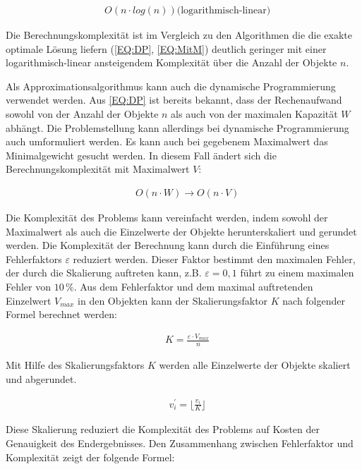 \begin{align}
    & O(n \cdot log(n)) \text{(logarithmisch-linear)}
\end{align}

Die Berechnungskomplexität ist im Vergleich zu den Algorithmen die die exakte optimale Lösung liefern (\autoref{EQ:DP}, \autoref{EQ:MitM}) deutlich geringer mit einer logarithmisch-linear ansteigendem Komplexität über die Anzahl der Objekte $ n $. 

Als Approximationsalgorithmus kann auch die dynamische Programmierung verwendet werden. Aus \autoref{EQ:DP} ist bereits bekannt, dass der Rechenaufwand sowohl von der Anzahl der Objekte $ n $ als auch von der maximalen Kapazität $ W $ abhängt. Die  Problemstellung kann allerdings bei dynamische Programmierung auch umformuliert werden. Es kann auch bei gegebenem Maximalwert das Minimalgewicht gesucht werden. In diesem Fall ändert sich die Berechnungskomplexität mit Maximalwert $ V $:

\begin{align}
    & O(n \cdot W)  \rightarrow O(n \cdot V) 
\end{align}

Die Komplexität des Problems kann vereinfacht werden, indem sowohl der Maximalwert als auch die Einzelwerte der Objekte herunterskaliert und gerundet werden.  Die Komplexität der Berechnung kann durch die Einführung eines Fehlerfaktors $ \varepsilon $ reduziert werden. Dieser Faktor bestimmt den maximalen Fehler, der durch die Skalierung auftreten kann, z.B. $ \varepsilon = 0,1 $ führt zu einem maximalen Fehler von $ 10\,\% $. Aus dem Fehlerfaktor und dem maximal auftretenden Einzelwert $ V_{max} $ in den Objekten kann der Skalierungsfaktor $ K $ nach folgender Formel berechnet werden:

\begin{align}
    & K = \frac{\varepsilon \cdot V_{max}}{n}
\end{align}

Mit Hilfe des Skalierungsfaktors $ K $ werden alle Einzelwerte der Objekte skaliert und abgerundet. 

\begin{align}
    & v_i^{\prime} = \lfloor \frac{v_i}{K} \rfloor
\end{align}

Diese Skalierung reduziert die Komplexität des Problems auf Kosten der Genauigkeit des Endergebnisses. Den Zusammenhang zwischen Fehlerfaktor und Komplexität zeigt der folgende Formel:

